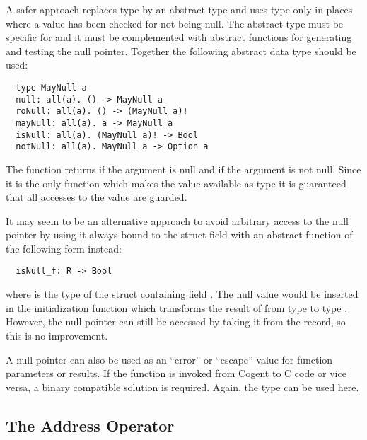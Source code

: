 A safer approach replaces type  by an abstract type and uses type  only in places where a value has been checked
for not being null. The abstract type must be specific for  and it must be complemented with abstract functions for
generating and testing the null pointer. Together the following abstract data type should be used:
\begin{verbatim}
  type MayNull a 
  null: all(a). () -> MayNull a
  roNull: all(a). () -> (MayNull a)!
  mayNull: all(a). a -> MayNull a
  isNull: all(a). (MayNull a)! -> Bool
  notNull: all(a). MayNull a -> Option a
\end{verbatim}
The function  returns  if the argument is null and  if the argument  is not null.
Since it is the only function which makes the value available as type  it is guaranteed that all accesses to the value
are guarded.

It may seem to be an alternative approach to avoid arbitrary access to the null pointer by using it always bound to the struct field 
with an abstract function of the following form instead:
\begin{verbatim}
  isNull_f: R -> Bool
\end{verbatim}
where  is the type of the struct containing field . The null value would be inserted in the initialization 
function which transforms the result of  from type  to type . However, the null 
pointer can still be accessed by taking it from the record, so this is no improvement.

A null pointer can also be used as an ``error'' or ``escape'' value for function parameters or results. If the function is
invoked from Cogent to C code or vice versa, a binary compatible solution is required. Again, the type  can
be used here.

\subsection{The Address Operator \code{\&}}
\label{app-trans-addrop}

